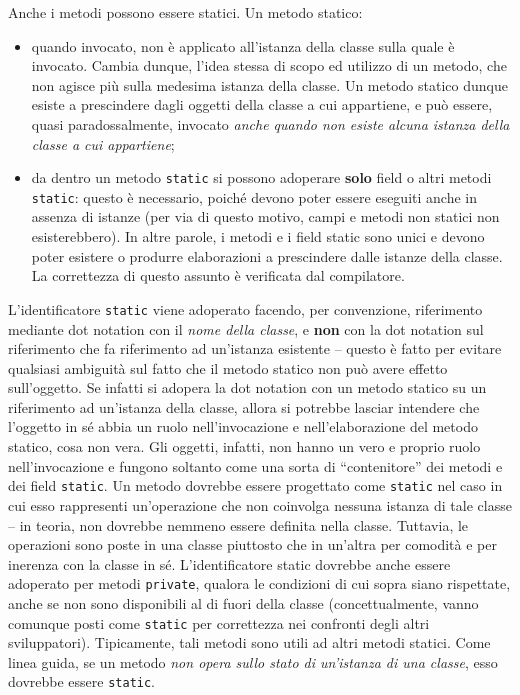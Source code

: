 \documentclass[\fontsizeclass,twocolumn]{\classname}
\theoremstyle{definition}
\theoremstyle{definition}
\begin{document}
Anche i metodi possono essere statici. Un metodo statico:
\begin{itemize}
    \item quando invocato, non è applicato all'istanza della classe sulla quale
        è invocato. Cambia dunque, l'idea stessa di scopo ed utilizzo di un
        metodo, che non agisce più sulla medesima istanza della classe. Un
        metodo statico dunque esiste a prescindere dagli oggetti della classe a
        cui appartiene, e può essere, quasi paradossalmente, invocato
        \emph{anche quando non esiste alcuna istanza della classe a cui
        appartiene};
    \item da dentro un metodo \texttt{static} si possono adoperare
        \textbf{solo} field o altri metodi \texttt{static}: questo è
        necessario, poiché devono poter essere eseguiti anche in assenza di
        istanze (per via di questo motivo, campi e metodi non statici non
        esisterebbero). In altre parole, i metodi e i field static sono unici e
        devono poter esistere o produrre elaborazioni a prescindere dalle
        istanze della classe. La correttezza di questo assunto è verificata dal
        compilatore.
\end{itemize}

L'identificatore \texttt{static} viene adoperato facendo, per convenzione,
riferimento mediante dot notation con il \emph{nome della classe}, e
\textbf{non} con la dot notation sul riferimento che fa riferimento ad
un'istanza esistente \--- questo è fatto per evitare qualsiasi ambiguità sul
fatto che il metodo statico non può avere effetto sull'oggetto. Se infatti si
adopera la dot notation con un metodo statico su un riferimento ad un'istanza
della classe, allora si potrebbe lasciar intendere che l'oggetto in sé abbia un
ruolo nell'invocazione e nell'elaborazione del metodo statico, cosa non vera.
Gli oggetti, infatti, non hanno un vero e proprio ruolo nell'invocazione e
fungono soltanto come una sorta di ``contenitore'' dei metodi e dei field
\texttt{static}. Un metodo dovrebbe essere progettato come \texttt{static} nel
caso in cui esso rappresenti un'operazione che non coinvolga nessuna istanza di
tale classe \--- in teoria, non dovrebbe nemmeno essere definita nella classe.
Tuttavia, le operazioni sono poste in una classe piuttosto che in un'altra per
comodità e per inerenza con la classe in sé. L'identificatore static dovrebbe
anche essere adoperato per metodi \texttt{private}, qualora le condizioni di
cui sopra siano rispettate, anche se non sono disponibili al di fuori della
classe (concettualmente, vanno comunque posti come \texttt{static} per
correttezza nei confronti degli altri sviluppatori). Tipicamente, tali metodi
sono utili ad altri metodi statici. Come linea guida, se un metodo \emph{non
opera sullo stato di un'istanza di una classe}, esso dovrebbe essere
\texttt{static}.
\end{document}
